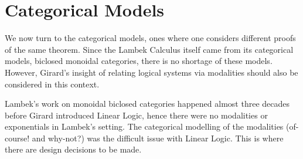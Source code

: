 \documentclass{llncs}
\begin{document}



\section{Categorical Models}

We now turn to the categorical models, ones where one considers
different proofs of the same theorem. Since the Lambek Calculus itself
came from its categorical models, biclosed monoidal categories, there
is no shortage of these models. However, Girard's insight of relating
logical systems via modalities should also be considered in this
context.

Lambek's work on monoidal biclosed categories happened almost three
decades before Girard introduced Linear Logic, hence there were no
modalities or exponentials in Lambek's setting. The categorical
modelling of the modalities (of-course! and why-not?) was the
difficult issue with Linear Logic.
This is where there are design decisions to be made. %
\end{document}
